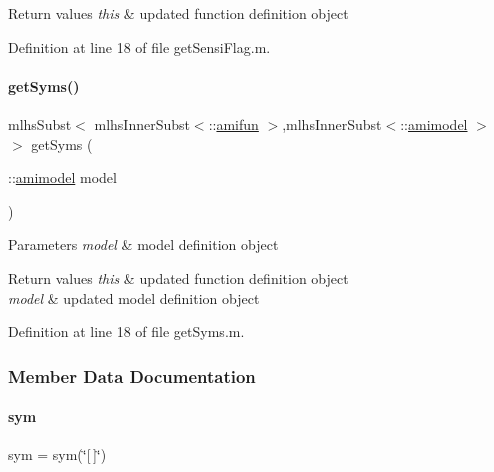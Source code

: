 \begin{DoxyRetVals}{Return values}
{\em this} & updated function definition object \\
\hline
\end{DoxyRetVals}


Definition at line 18 of file get\+Sensi\+Flag.\+m.

\mbox{\label{classamifun_a44e49602645d85f94841f38e4673fa1a}} 
\paragraph{\texorpdfstring{get\+Syms()}{getSyms()}}
{\footnotesize\ttfamily mlhs\+Subst$<$ mlhs\+Inner\+Subst$<$\+::\mbox{\hyperlink{classamifun}{amifun}} $>$,mlhs\+Inner\+Subst$<$\+::\mbox{\hyperlink{classamimodel}{amimodel}} $>$ $>$ get\+Syms (\begin{DoxyParamCaption}\item[{\+::\mbox{\hyperlink{classamimodel}{amimodel}}}]{model }\end{DoxyParamCaption})}


\begin{DoxyParams}{Parameters}
{\em model} & model definition object\\
\hline
\end{DoxyParams}

\begin{DoxyRetVals}{Return values}
{\em this} & updated function definition object \\
\hline
{\em model} & updated model definition object \\
\hline
\end{DoxyRetVals}


Definition at line 18 of file get\+Syms.\+m.



\subsubsection{Member Data Documentation}
\mbox{\label{classamifun_a3c48fff3d28406486a4f1b5e18da7ca6}} 
\paragraph{\texorpdfstring{sym}{sym}}
{\footnotesize\ttfamily sym = sym(\char`\"{}\mbox{[}$\,$\mbox{]}\char`\"{})}

